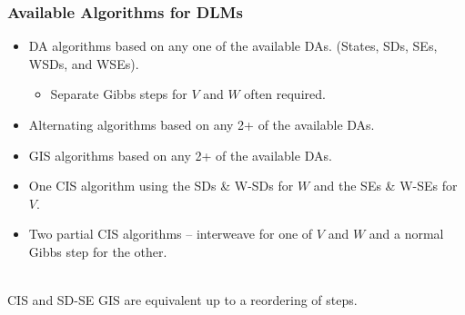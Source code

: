 \documentclass[xcolor=dvipsnames]{beamer}
\begin{document}
\begin{frame}
\frametitle{Available Algorithms for DLMs}
\begin{itemize}
\item DA algorithms based on any one of the available DAs. (States, SDs, SEs, WSDs, and WSEs).
\begin{itemize}
\item Separate Gibbs steps for $V$ and $W$ often required.
\end{itemize}
\end{itemize}
\pause\begin{itemize}
\item Alternating algorithms based on any 2+ of the available DAs.
\end{itemize}
\begin{itemize}
\item GIS algorithms based on any 2+ of the available DAs.
\end{itemize}
\pause\begin{itemize}
\item One CIS algorithm using the SDs \& W-SDs for $W$ and the SEs \& W-SEs for $V$.
\end{itemize}
\pause
\begin{itemize}
\item Two partial CIS algorithms -- interweave for one of $V$ and $W$ and a normal Gibbs step for the other.\\~
\end{itemize}

\pause CIS and SD-SE GIS are equivalent up to a reordering of steps.

\end{frame}
\end{document}
